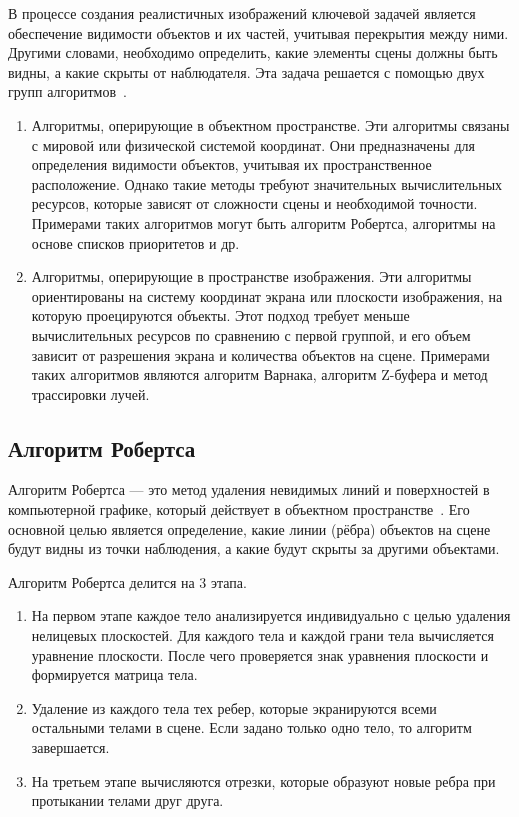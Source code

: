 В процессе создания реалистичных изображений ключевой задачей является обеспечение видимости объектов и их частей, учитывая перекрытия между ними. Другими словами, необходимо определить, какие элементы сцены должны быть видны, а какие скрыты от наблюдателя. Эта задача решается с помощью двух групп алгоритмов~\cite{rogers}.
\begin{enumerate}
    \item Алгоритмы, оперирующие в объектном пространстве. 
    Эти алгоритмы связаны с мировой или физической системой координат. 
    Они предназначены для определения видимости объектов, учитывая их пространственное расположение. 
    Однако такие методы требуют значительных вычислительных ресурсов, которые зависят от сложности сцены и необходимой точности. 
    Примерами таких алгоритмов могут быть алгоритм Робертса, алгоритмы на основе списков приоритетов и др.
    \item Алгоритмы, оперирующие в пространстве изображения. 
    Эти алгоритмы ориентированы на систему координат экрана или плоскости изображения, на которую проецируются объекты. 
    Этот подход требует меньше вычислительных ресурсов по сравнению с первой группой, и его объем зависит от разрешения экрана и количества объектов на сцене. 
    Примерами таких алгоритмов являются алгоритм Варнака, алгоритм Z-буфера и метод трассировки лучей.
\end{enumerate}

\subsection{Алгоритм Робертса}

Алгоритм Робертса — это метод удаления невидимых линий и поверхностей в компьютерной графике, который действует в объектном пространстве~\cite{rogers}. 
Его основной целью является определение, какие линии (рёбра) объектов на сцене будут видны из точки наблюдения, а какие будут скрыты за другими объектами.

Алгоритм Робертса делится на 3 этапа.
\begin{enumerate}
    \item На первом этапе каждое тело анализируется индивидуально с целью удаления нелицевых плоскостей. 
    Для каждого тела и каждой грани тела вычисляется уравнение плоскости. 
    После чего проверяется знак уравнения плоскости и формируется матрица тела. 
    \item Удаление из каждого тела тех ребер, которые экранируются всеми остальными телами в сцене. 
    Если задано только одно тело, то алгоритм завершается.
    \item На третьем этапе вычисляются отрезки, которые образуют новые ребра при протыкании телами друг друга. 
\end{enumerate}

